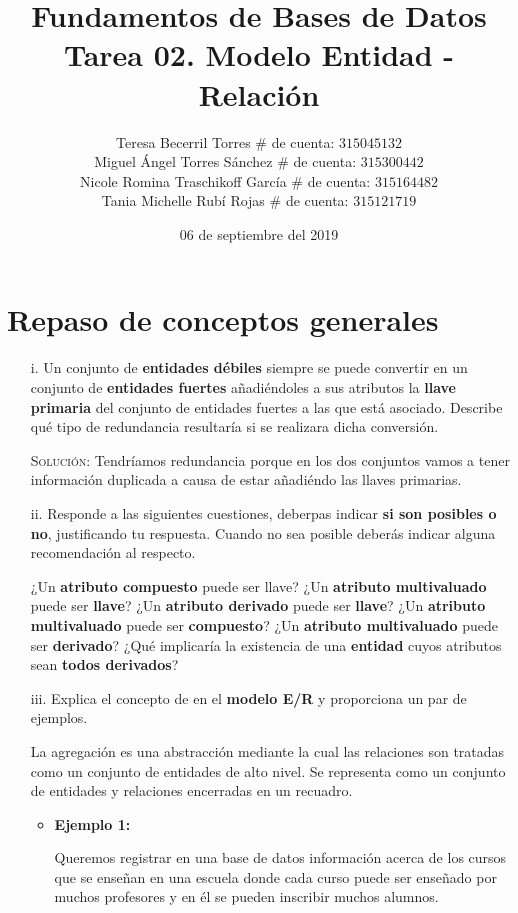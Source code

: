\documentclass[letterpaper,11pt]{article}
\title{Fundamentos de Bases de Datos \\
       Tarea 02. Modelo Entidad - Relación}
\author{Teresa Becerril Torres
        $\#$ de cuenta: $315045132$ \\
        Miguel Ángel Torres Sánchez
        $\#$ de cuenta: $315300442$ \\
        Nicole Romina Traschikoff García
        $\#$ de cuenta: $315164482$ \\
        Tania Michelle Rubí Rojas
        $\#$ de cuenta: $315121719$}
\date{06 de septiembre del 2019}
\begin{document}
\maketitle

\section{Repaso de conceptos generales}
\begin{itemize}
    \item[i.] Un conjunto de \textbf{entidades débiles} siempre se puede 
    convertir en un conjunto de \textbf{entidades fuertes} añadiéndoles a sus 
    atributos la \textbf{llave primaria} del conjunto de entidades fuertes a 
    las que está asociado. Describe qué tipo de redundancia resultaría si se 
    realizara dicha conversión.

    \textsc{Solución:} Tendríamos redundancia porque en los dos conjuntos vamos 
    a tener información duplicada a causa de estar añadiéndo las llaves 
    primarias.

    \item[ii.] Responde a las siguientes cuestiones, deberpas indicar 
    \textbf{si son posibles o no}, justificando tu respuesta. Cuando no sea 
    posible deberás indicar alguna recomendación al respecto.

    ¿Un \textbf{atributo compuesto} puede ser llave? ¿Un \textbf{atributo
    multivaluado} puede ser \textbf{llave}? ¿Un \textbf{atributo derivado}
    puede ser \textbf{llave}? ¿Un \textbf{atributo multivaluado} puede ser 
    \textbf{compuesto}? ¿Un \textbf{atributo multivaluado} puede ser 
    \textbf{derivado}? ¿Qué implicaría la existencia de una \textbf{entidad}
    cuyos atributos sean \textbf{todos derivados}?  
    
    \item[iii.] Explica el concepto de  en el 
    \textbf{modelo E/R} y proporciona un par de ejemplos.

    La agregación es una abstracción mediante la cual las relaciones 
    son tratadas como un conjunto de entidades de alto nivel. Se 
    representa como un conjunto de entidades y relaciones encerradas 
    en un recuadro.

    \begin{itemize}
        \item  \textbf{Ejemplo 1:}
        
               Queremos registrar en una base de datos información acerca 
               de los cursos que se enseñan en una escuela donde cada 
               curso puede ser enseñado por muchos profesores y en él 
               se pueden inscribir muchos alumnos. 


\end{itemize}
\end{itemize}
\end{document}
